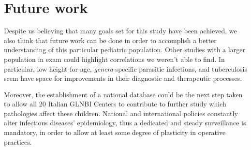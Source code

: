 \section{Future work}\label{sec:futurework}
Despite us believing that many goals set for this study have been achieved, we also think that future work can be done in order to accomplish a better understanding of this particular pediatric population. Other studies with a larger population in exam could highlight correlations we weren't able to find. In particular, low height-for-age, \textit{genera}-specific parasitic infections, and tuberculosis seem have space for improvements in their diagnostic and therapeutic processes.

Moreover, the establishment of a national database could be the next step taken to allow all 20 Italian GLNBI Centers to contribute to further study which pathologies affect these children. National and international policies constantly alter infectious diseases' epidemiology, thus a dedicated and steady surveillance is mandatory, in order to allow at least some degree of plasticity in operative practices.  